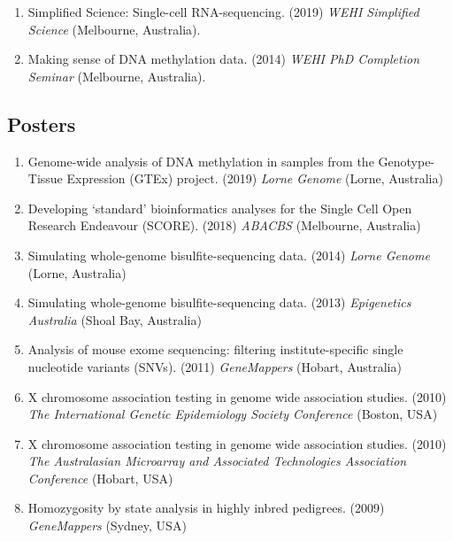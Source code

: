 \documentclass[11pt,letterpaper,pdf]{article}
\newcommand{\mycon}[1]{\smallskip\begin{enumerate}[resume,label={\scriptsize \arabic*$\ $},leftmargin=\parindent]\setlength{\itemsep}{#1}\vspace*{-0.7em}}
\newcommand{\ee}{\end{enumerate}}
\newcommand{\talk}[4]{%
  \item #1. (#2) {\it #3} (#4).}
\newcommand{\poster}[4]{%
\item #1. (#2) {\it #3} (#4)}
\begin{document}
{\mycon{0.3em}

\talk{Simplified Science: Single-cell RNA-sequencing}{2019}{WEHI Simplified Science}{Melbourne, Australia}

\talk{Making sense of DNA methylation data}{2014}{WEHI PhD Completion Seminar}{Melbourne, Australia}

\ee

\subsection*{Posters}


\mycon{0.3em}

\poster{Genome-wide analysis of DNA methylation in samples from the Genotype-Tissue Expression (GTEx) project}{2019}{Lorne Genome}{Lorne, Australia}

\poster{Developing `standard' bioinformatics analyses for the Single Cell Open Research Endeavour (SCORE)}{2018}{ABACBS}{Melbourne, Australia}

\poster{Simulating whole-genome bisulfite-sequencing data}{2014}{Lorne Genome}{Lorne, Australia}

\poster{Simulating whole-genome bisulfite-sequencing data}{2013}{Epigenetics Australia}{Shoal Bay, Australia}

\poster{Analysis of mouse exome sequencing: filtering institute-specific single nucleotide variants (SNVs)}{2011}{GeneMappers}{Hobart, Australia}

\poster{X chromosome association testing in genome wide association studies}{2010}{The International Genetic Epidemiology Society Conference}{Boston, USA}

\poster{X chromosome association testing in genome wide association studies}{2010}{The Australasian Microarray and Associated Technologies Association Conference}{Hobart, USA}

\poster{Homozygosity by state analysis in highly inbred pedigrees}{2009}{GeneMappers}{Sydney, USA}

\ee

}{}
\end{document}
